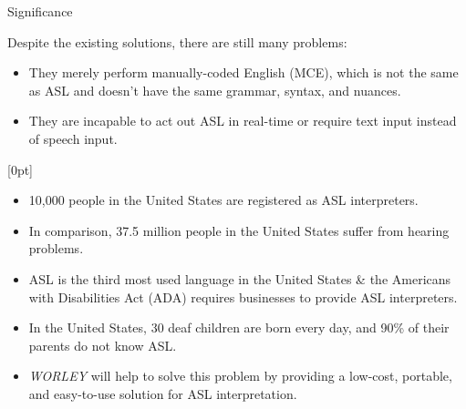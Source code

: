 \documentclass[final, 20pt]{beamer}
\newlength{\colwidth}
\newlength{\twocolwidth}
\begin{document}
\begin{frame}[t]
\begin{columns}[t]
\begin{column}{\twocolwidth}
\begin{block}{Significance}
\begin{minipage}[t]{0.48\linewidth}
          Despite the existing solutions, there are still many problems:

          \begin{itemize}
            \item They merely perform manually-coded English (MCE), which is not the same as ASL and doesn't have the same grammar, syntax, and nuances.
            \item They are incapable to act out ASL in real-time or require text input instead of speech input.
          \end{itemize}
        \end{minipage}\hfill%
        \begin{minipage}[t]{0.48\linewidth}
          [0pt]

          \begin{itemize}
            \item 10,000 people in the United States are registered as ASL interpreters.
            \item In comparison, 37.5 million people in the United States suffer from hearing problems.
            \item ASL is the third most used language in the United States \& the Americans with Disabilities Act (ADA) requires businesses to provide ASL interpreters.
            \item In the United States, 30 deaf children are born every day, and 90\% of their parents do not know ASL.
            \item \emph{WORLEY} will help to solve this problem by providing a low-cost, portable, and easy-to-use solution for ASL interpretation.
          \end{itemize}
        \end{minipage}
      \end{block}


\end{column}
\end{columns}
\end{frame}
\end{document}

